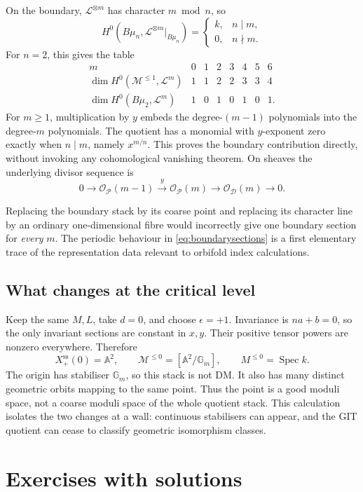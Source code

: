 \documentclass[11pt,a4paper]{article}
\numberwithin{equation}{section}
\theoremstyle{definition}
\newcommand{\A}{\mathbb A}
\newcommand{\Gm}{\mathbb G_m}
\newcommand{\OO}{\mathcal O}
\newcommand{\cD}{\mathcal D}
\newcommand{\cL}{\mathcal L}
\newcommand{\cM}{\mathcal M}
\newcommand{\cP}{\mathcal P}
\newcommand{\Spec}{\operatorname{Spec}}
\newcommand{\sst}{\mathrm{ss}}
\begin{document}
On the boundary, $\cL^{\otimes m}$ has character $m\bmod n$, so
\begin{equation}\label{eq:boundarysections}
 H^0(B\mu_n,\cL^{\otimes m}|_{B\mu_n})
 =\begin{cases}k,&n\mid m,\\0,&n\nmid m.\end{cases}
\end{equation}
For $n=2$, this gives the table
\[
\begin{array}{c|rrrrrrr}
 m&0&1&2&3&4&5&6\\\hline
 \dim H^0(\cM^{\le1},\cL^m)&1&1&2&2&3&3&4\\
 \dim H^0(B\mu_2,\cL^m)&1&0&1&0&1&0&1.
\end{array}
\]
For $m\ge1$, multiplication by $y$ embeds the degree-$(m-1)$
polynomials into the degree-$m$ polynomials. The quotient has a monomial
with $y$-exponent zero exactly when $n\mid m$, namely $x^{m/n}$.
This proves the boundary contribution directly, without invoking any
cohomological vanishing theorem. On sheaves the underlying divisor
sequence is
\[
 0\to\OO_{\cP}(m-1)\xrightarrow{\ y\ }
 \OO_{\cP}(m)\to\OO_{\cD}(m)\to0.
\]

Replacing the boundary stack by its coarse point and replacing its
character line by an ordinary one-dimensional fibre would incorrectly
give one boundary section for \emph{every} $m$. The periodic behaviour in
\eqref{eq:boundarysections} is a first elementary trace of the
representation data relevant to orbifold index calculations.

\subsection{What changes at the critical level}
Keep the same $M,L$, take $d=0$, and choose $\epsilon=+1$. Invariance is
$na+b=0$, so the only invariant sections are constant in $x,y$.
Their positive tensor powers are nonzero everywhere. Therefore
\[
 X^{\sst}_+(0)=\A^2,\qquad
 \cM^{\le0}=[\A^2/\Gm],\qquad M^{\le0}=\Spec k.
\]
The origin has stabiliser $\Gm$, so this stack is not DM. It also has
many distinct geometric orbits mapping to the same point. Thus the point
is a good moduli space, not a coarse moduli space of the whole quotient
stack. This calculation isolates the two changes at a wall: continuous
stabilisers can appear, and the GIT quotient can cease to classify
geometric isomorphism classes.

\section{Exercises with solutions}
\label{sec:exercises}
\end{document}
